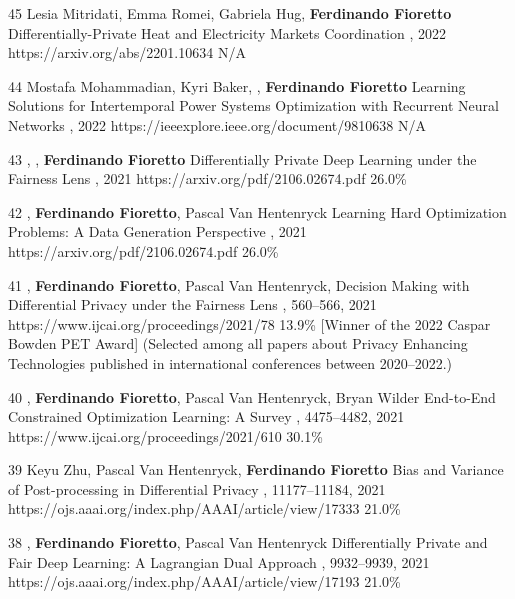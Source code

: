 \begin{pubs}
	\confentry
	{45} %
	{Lesia Mitridati, Emma Romei, Gabriela Hug, {\bf Ferdinando Fioretto}}
	{Differentially-Private Heat and Electricity Markets Coordination}
	{\procPMAPS, 2022}
	{https://arxiv.org/abs/2201.10634}
	{N/A}

	\confentry
	{44} %
	{Mostafa Mohammadian, Kyri Baker, , {\bf Ferdinando Fioretto}}
	{Learning Solutions for Intertemporal Power Systems Optimization with Recurrent Neural Networks}
	{\procPMAPS, 2022}
	{https://ieeexplore.ieee.org/document/9810638}
	{N/A}


	\confentry 
	{43} %
	{, , {\bf Ferdinando Fioretto}}
	{Differentially Private Deep Learning under the Fairness Lens}
	{\procNeurIPS, 2021}
	{https://arxiv.org/pdf/2106.02674.pdf}
	{26.0\%} %

	\confentry 
	{42} %
	{, {\bf Ferdinando Fioretto}, Pascal Van Hentenryck}
	{Learning Hard Optimization Problems: A Data Generation Perspective}
	{\procNeurIPS, 2021}
	{https://arxiv.org/pdf/2106.02674.pdf}
	{26.0\%} %

	\confentryAwd 
	{41} %
	{, {\bf Ferdinando Fioretto}, Pascal Van Hentenryck, }
	{Decision Making with Differential Privacy under the Fairness Lens}
	{\procIJCAI, 560--566, 2021}
	{https://www.ijcai.org/proceedings/2021/78}
	{13.9\%} %
	{[Winner of the 2022 Caspar Bowden PET Award]}
	{(Selected among all papers about Privacy Enhancing Technologies published in international conferences between 2020--2022.)}

	\confentry 
	{40} %
	{, {\bf Ferdinando Fioretto}, Pascal Van Hentenryck, Bryan Wilder}
	{End-to-End Constrained Optimization Learning: A Survey}
	{\procIJCAI, 4475--4482, 2021}
	{https://www.ijcai.org/proceedings/2021/610}
	{30.1\%}

	\confentry 
	{39} %
	{Keyu Zhu, Pascal Van Hentenryck, {\bf Ferdinando Fioretto}}
	{Bias and Variance of Post-processing in Differential Privacy}
	{\procAAAI, 11177--11184, 2021}
	{https://ojs.aaai.org/index.php/AAAI/article/view/17333}
    {21.0\%} %

	\confentry 
	{38} %
	{, {\bf Ferdinando Fioretto}, Pascal Van Hentenryck}
	{Differentially Private and Fair Deep Learning: A Lagrangian Dual Approach}
	{\procAAAI, 9932--9939, 2021}
	{https://ojs.aaai.org/index.php/AAAI/article/view/17193}
    {21.0\%} %


\end{pubs}
